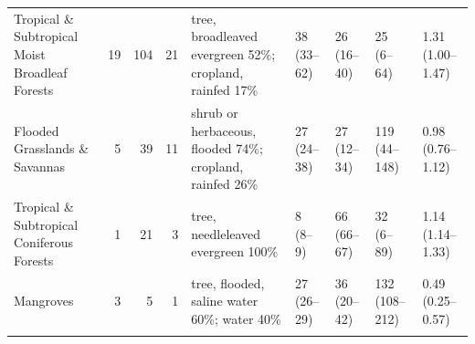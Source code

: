 \begin{table}[t]
\begin{tabular}{p{3.2cm}rrrp{4.2cm}llll}
Tropical \& Subtropical Moist Broadleaf Forests & 19 & 104 & 21 & tree, broadleaved evergreen 52\%; cropland, rainfed 17\% & 38 (33--62) & 26 (16--40) & 25 (6--64) & 1.31 (1.00--1.47) \\
Flooded Grasslands \& Savannas & 5 & 39 & 11 & shrub or herbaceous, flooded 74\%; cropland, rainfed 26\% & 27 (24--38) & 27 (12--34) & 119 (44--148) & 0.98 (0.76--1.12) \\
Tropical \& Subtropical Coniferous Forests & 1 & 21 & 3 & tree, needleleaved evergreen 100\% & 8 (8--9) & 66 (66--67) & 32 (6--89) & 1.14 (1.14--1.33) \\
Mangroves & 3 & 5 & 1 & tree, flooded, saline water 60\%; water 40\% & 27 (26--29) & 36 (20--42) & 132 (108--212) & 0.49 (0.25--0.57) \\
\bottomhline
\end{tabular}
\end{table}
